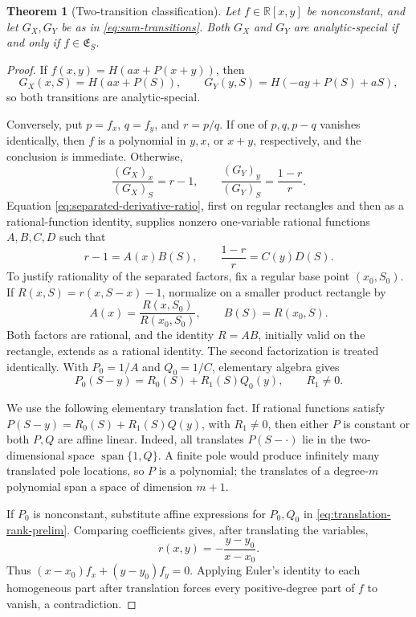 \documentclass[11pt]{article}
\newtheorem{theorem}{Theorem}[section]
\begin{document}
\begin{theorem}[Two-transition classification]
\label{thm:two-transition}
Let \(f\in\mathbb R[x,y]\) be nonconstant, and let \(G_X,G_Y\) be as in
\eqref{eq:sum-transitions}.  Both \(G_X\) and \(G_Y\) are
analytic-special if and only if
\(f\in\mathfrak E_S\).
\end{theorem}

\begin{proof}
If \(f(x,y)=H(ax+P(x+y))\), then
\[
 G_X(x,S)=H(ax+P(S)),
 \qquad
 G_Y(y,S)=H(-ay+P(S)+aS),
\]
so both transitions are analytic-special.

Conversely, put \(p=f_x\), \(q=f_y\), and \(r=p/q\).  If one of
\(p,q,p-q\) vanishes identically, then \(f\) is a polynomial in
\(y,x\), or \(x+y\), respectively, and the conclusion is immediate.
Otherwise,
\[
 \frac{(G_X)_x}{(G_X)_S}=r-1,
 \qquad
 \frac{(G_Y)_y}{(G_Y)_S}=\frac{1-r}{r}.
\]
Equation \eqref{eq:separated-derivative-ratio}, first on regular
rectangles and then as a rational-function identity, supplies
nonzero one-variable rational functions \(A,B,C,D\) such that
\[
 r-1=A(x)B(S),
 \qquad
 \frac{1-r}{r}=C(y)D(S).
\]
To justify rationality of the separated factors, fix a regular base
point \((x_0,S_0)\).  If \(R(x,S)=r(x,S-x)-1\), normalize on a
smaller product rectangle by
\[
 A(x)=\frac{R(x,S_0)}{R(x_0,S_0)},
 \qquad B(S)=R(x_0,S).
\]
Both factors are rational, and the identity \(R=A B\), initially
valid on the rectangle, extends as a rational identity.  The second
factorization is treated identically.
With \(P_0=1/A\) and \(Q_0=1/C\), elementary algebra gives
\begin{equation}
 P_0(S-y)=R_0(S)+R_1(S)Q_0(y),
 \qquad R_1\ne0.
 \label{eq:translation-rank-prelim}
\end{equation}

We use the following elementary translation fact.  If rational
functions satisfy
\(P(S-y)=R_0(S)+R_1(S)Q(y)\), with \(R_1\ne0\), then either
\(P\) is constant or both \(P,Q\) are affine linear.  Indeed, all
translates \(P(S-\cdot)\) lie in the two-dimensional space
\(\operatorname{span}\{1,Q\}\).  A finite pole would produce
infinitely many translated pole locations, so \(P\) is a polynomial;
the translates of a degree-\(m\) polynomial span a space of dimension
\(m+1\).

If \(P_0\) is nonconstant, substitute affine expressions for
\(P_0,Q_0\) in \eqref{eq:translation-rank-prelim}.  Comparing
coefficients gives, after translating the variables,
\[
 r(x,y)=-\frac{y-y_0}{x-x_0}.
\]
Thus
\((x-x_0)f_x+(y-y_0)f_y=0\).  Applying Euler's identity to each
homogeneous part after translation forces every positive-degree part
of \(f\) to vanish, a contradiction.


\end{proof}
\end{document}
